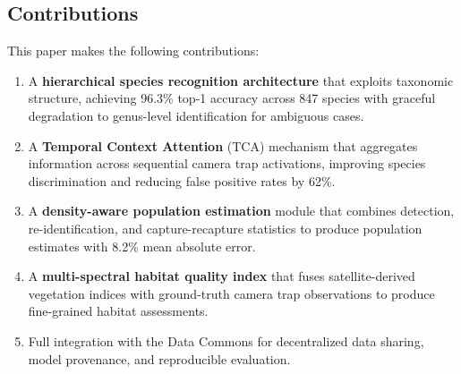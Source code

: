 \subsection{Contributions}

This paper makes the following contributions:

\begin{enumerate}[leftmargin=*]
    \item A \textbf{hierarchical species recognition architecture} that exploits taxonomic structure, achieving 96.3\% top-1 accuracy across 847 species with graceful degradation to genus-level identification for ambiguous cases.
    \item A \textbf{Temporal Context Attention} (TCA) mechanism that aggregates information across sequential camera trap activations, improving species discrimination and reducing false positive rates by 62\%.
    \item A \textbf{density-aware population estimation} module that combines detection, re-identification, and capture-recapture statistics to produce population estimates with 8.2\% mean absolute error.
    \item A \textbf{multi-spectral habitat quality index} that fuses satellite-derived vegetation indices with ground-truth camera trap observations to produce fine-grained habitat assessments.
    \item Full integration with the \Zoo{} Data Commons for decentralized data sharing, model provenance, and reproducible evaluation.
\end{enumerate}

